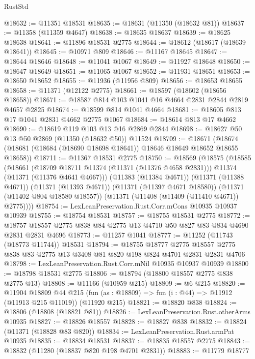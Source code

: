 \begin{lexlean}{RustStd}
\begin{coremodule}
@18632 := @11351 @18531
@18635 := @18631 (@11350 (@18632 @81))
@18637 := @11358 (@11359 @4647)
@18638 := @18635 @18637
@18639 := @18625 @18638
@18641 := @11896 @18531 @2775
@18644 := @18612 (@18617 (@18639 @18641))
@18645 := @10971 @809
@18646 := @11167 @18645
@18647 := @18644 @18646
@18648 := @11041 @1067
@18649 := @11927 @18648
@18650 := @18647 @18649
@18651 := @11065 @1067
@18652 := @11931 @18651
@18653 := @18650 @18652
@18655 := @11936 (@11956 @809)
@18656 := @18653 @18655
@18658 := @11371 (@12122 @2775)
@18661 := @18597 (@18602 (@18656 @18658))
@18671 := @18587 @814 @103 @1041 @16 @4664 @2831 @2844 @2819 @4657 @2825
@18674 := @18599 @814 @1041 @4664
@18681 := @18605 @813 @17 @1041 @2831 @4662 @2775 @1067
@18684 := @18614 @813 @17 @4662
@18690 := @18619 @119 @103 @13 @16 @2869 @2844
@18698 := @18627 @50 @13 @50 @2869 (@11350 (@18632 @50)) @11524
@18709 := @18671
    (@18674 (@18681 (@18684 (@18690 @18698 @18641)) @18646 @18649 @18652 @18655 @18658))
@18711 := @11367 @18531 @2775
@18750 := @18569
    (@18575
      (@18585
        (@18661
          (@18709 @18711 @11374 (@11371 (@11376 @4658 @2831)))
          @11374
          (@11371 (@11376 @4641 @4667)))
        (@11383 (@11384 @4671))
        (@11371 (@11388 @4671))
        (@11371 (@11393 @4671))
        (@11371 (@11397 @4671 @18580))
        (@11371 (@11402 @804 @18580 @18557))
        (@11371 (@11408 (@11409 (@11410 @4671)) @2775))))
@18754 := LexLeanPreservation.Rust.Corr.mCons @10935 @10937 @10939
@18755 := @18754 @18531
@18757 := @18755 @18531 @2775
@18772 := @18757 @18557 @2775 @838 @84 @2775 @13 @4710 @50 @827 @83 @834 @4690 @2831 @2831 @4696
@18773 := @11257 @1041
@18777 := @11252 (@11743 (@18773 @11744)) @18531
@18794 := @18755
    @18777
    @2775
    @18557
    @2775
    @838
    @83
    @2775
    @13
    @3408
    @81
    @820
    @198
    @824
    @4701
    @2831
    @2831
    @4706
@18798 := LexLeanPreservation.Rust.Corr.mNil @10935 @10937 @10939
@18800 := @18798 @18531 @2775
@18806 := @18794 (@18800 @18557 @2775 @838 @2775 @13)
@18808 := @11166 (@10959 @215)
@18809 := @6 @215
@18820 := @11904
    @18809
    @44
    @215
    (fun (as : @18809) => fun (i : @44) => @11912 (@11913 @215 @11019))
    (@11920 @215)
@18821 := @18820 @838
@18824 := @18806 (@18808 (@18821 @81))
@18826 := LexLeanPreservation.Rust.otherArms @10935
@18827 := @18826 @18557
@18828 := @18827 @838
@18832 := @18824 (@11371 (@18828 @83 @820))
@18834 := LexLeanPreservation.Rust.armPat @10935
@18835 := @18834 @18531
@18837 := @18835 @18557 @2775
@18843 := @18832 (@11280 (@18837 @820 @198 @4701 @2831))
@18883 := @11779
    @18777

\end{coremodule}
\end{lexlean}
